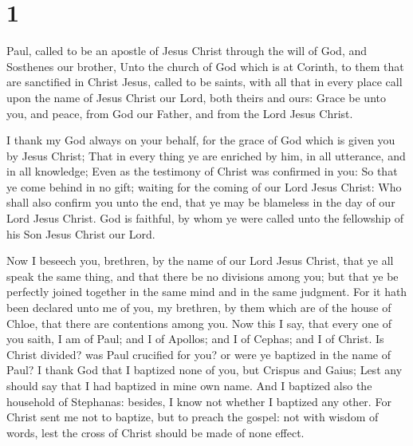 \hypertarget{section}{%
\section{1}\label{section}}

 Paul, called to be an apostle of Jesus Christ through the
will of God, and Sosthenes our brother,  Unto the church
of God which is at Corinth, to them that are sanctified in Christ Jesus,
called to be saints, with all that in every place call upon the name of
Jesus Christ our Lord, both theirs and ours:  Grace be
unto you, and peace, from God our Father, and from the Lord Jesus
Christ.

 I thank my God always on your behalf, for the grace of
God which is given you by Jesus Christ;  That in every
thing ye are enriched by him, in all utterance, and in all knowledge;
 Even as the testimony of Christ was confirmed in you:
 So that ye come behind in no gift; waiting for the coming
of our Lord Jesus Christ:  Who shall also confirm you unto
the end, that ye may be blameless in the day of our Lord Jesus Christ.
 God is faithful, by whom ye were called unto the
fellowship of his Son Jesus Christ our Lord.

 Now I beseech you, brethren, by the name of our Lord
Jesus Christ, that ye all speak the same thing, and that there be no
divisions among you; but that ye be perfectly joined together in the
same mind and in the same judgment.  For it hath been
declared unto me of you, my brethren, by them which are of the house of
Chloe, that there are contentions among you.  Now this I
say, that every one of you saith, I am of Paul; and I of Apollos; and I
of Cephas; and I of Christ.  Is Christ divided? was Paul
crucified for you? or were ye baptized in the name of Paul?
 I thank God that I baptized none of you, but Crispus and
Gaius;  Lest any should say that I had baptized in mine
own name.  And I baptized also the household of
Stephanas: besides, I know not whether I baptized any other.
 For Christ sent me not to baptize, but to preach the
gospel: not with wisdom of words, lest the cross of Christ should be
made of none effect.

